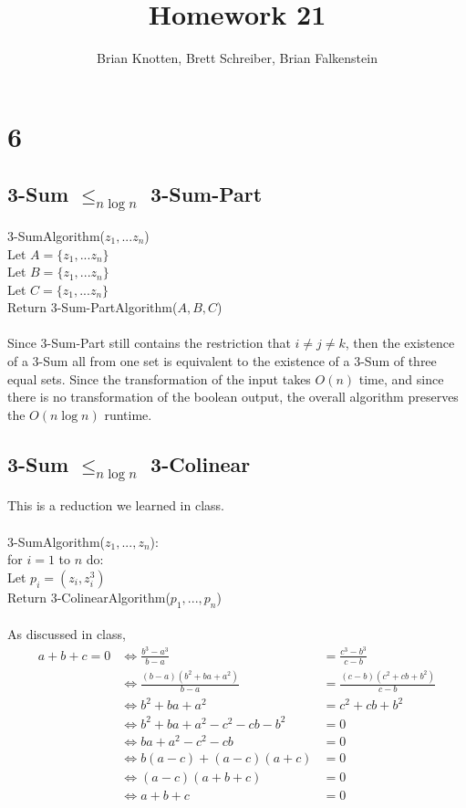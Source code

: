 \documentclass[letterpaper,notitlepage,twoside]{article}
\renewcommand{\iff}{\Leftrightarrow} %
\newcommand\tab[1][1cm]{\hspace*{#1}} %
\begin{document}
\title{Homework 21}
\author{Brian Knotten, Brett Schreiber, Brian Falkenstein}
\maketitle
\section*{6}

\subsection*{3-Sum $\leq_{n \log n}$ 3-Sum-Part}
3-SumAlgorithm($z_1,...z_n$)\\
\tab Let $A = \{z_1,...z_n\}$\\
\tab Let $B = \{z_1,...z_n\}$\\
\tab Let $C = \{z_1,...z_n\}$\\
\tab Return 3-Sum-PartAlgorithm($A, B, C$)
\\\\
Since 3-Sum-Part still contains the restriction that $i \neq j \neq k$, then the existence of a 3-Sum all from one set is equivalent to the existence of a 3-Sum of three equal sets. Since the transformation of the input takes $O(n)$ time, and since there is no transformation of the boolean output, the overall algorithm preserves the $O(n \log n)$ runtime.

\subsection*{3-Sum $\leq_{n \log n}$ 3-Colinear}
This is a reduction we learned in class.
\\\\
3-SumAlgorithm($z_1,...,z_n$):\\
\tab for $i = 1$ to $n$ do:\\
\tab\tab Let $p_i = (z_i, z_i^3)$\\
\tab Return 3-ColinearAlgorithm($p_1,...,p_n$)
\\\\
As discussed in class,
\begin{align*}
a + b + c = 0 &\iff \frac{b^3 - a^3}{b - a} &= \frac{c^3 - b^3}{c - b}\\
&\iff \frac{(b - a)(b^2 + ba + a^2)}{b - a} &= \frac{(c - b)(c^2 + cb + b^2)}{c - b}\\
&\iff b^2 + ba + a^2 &= c^2 + cb + b^2\\
&\iff b^2 + ba + a^2 - c^2 - cb - b^2 &= 0\\
&\iff ba + a^2 - c^2 - cb &= 0\\
&\iff b(a - c) + (a - c)(a + c) &= 0\\
&\iff (a - c)(a + b + c) &= 0\\
&\iff a + b + c &= 0
\end{align*}
\end{document}
